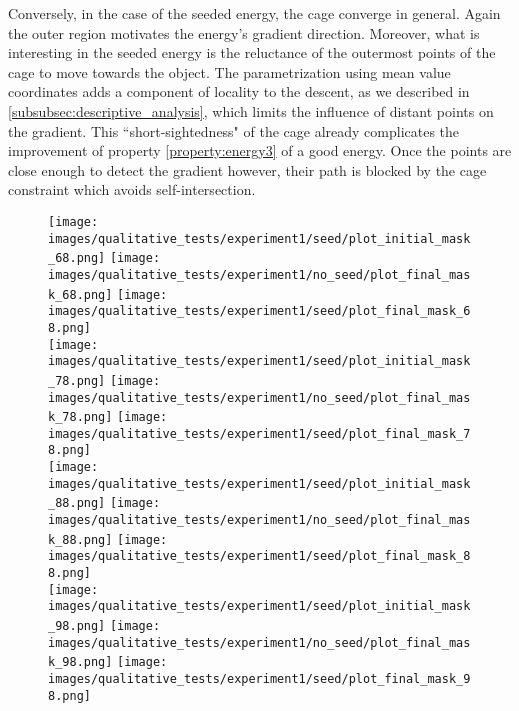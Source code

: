 Conversely, in the case of the seeded energy, the cage converge in general. Again the outer region motivates the energy's gradient direction. Moreover, what is interesting in the seeded energy is the reluctance of the outermost points of the cage to move towards the object.  The parametrization using mean value coordinates adds a component of locality to the descent, as we described in \ref{subsubsec:descriptive_analysis}, which limits the influence of distant points on the gradient. This ``short-sightedness" of the cage already complicates the improvement of property \ref{property:energy3} of a good energy. Once the points are close enough to detect the gradient however, their path is blocked by the cage constraint which avoids self-intersection.

\begin{figure}[h!]
	\centering
	\texttt{[image: images/qualitative\_tests/experiment1/seed/plot\_initial\_mask\_68.png]}\hspace{0.025\textwidth}%
	\texttt{[image: images/qualitative\_tests/experiment1/no\_seed/plot\_final\_mask\_68.png]}\hspace{0.025\textwidth}%
	\texttt{[image: images/qualitative\_tests/experiment1/seed/plot\_final\_mask\_68.png]}\\[0.2em]
	
	\texttt{[image: images/qualitative\_tests/experiment1/seed/plot\_initial\_mask\_78.png]}\hspace{0.025\textwidth}%
	\texttt{[image: images/qualitative\_tests/experiment1/no\_seed/plot\_final\_mask\_78.png]}\hspace{0.025\textwidth}%
	\texttt{[image: images/qualitative\_tests/experiment1/seed/plot\_final\_mask\_78.png]}\\[0.2em]
	
	\texttt{[image: images/qualitative\_tests/experiment1/seed/plot\_initial\_mask\_88.png]}\hspace{0.025\textwidth}%
	\texttt{[image: images/qualitative\_tests/experiment1/no\_seed/plot\_final\_mask\_88.png]}\hspace{0.025\textwidth}%
	\texttt{[image: images/qualitative\_tests/experiment1/seed/plot\_final\_mask\_88.png]}\\[0.2em]
	
	\texttt{[image: images/qualitative\_tests/experiment1/seed/plot\_initial\_mask\_98.png]}\hspace{0.025\textwidth}%
	\texttt{[image: images/qualitative\_tests/experiment1/no\_seed/plot\_final\_mask\_98.png]}\hspace{0.025\textwidth}%
	\texttt{[image: images/qualitative\_tests/experiment1/seed/plot\_final\_mask\_98.png]}\\[0.2em]
	

\end{figure}
